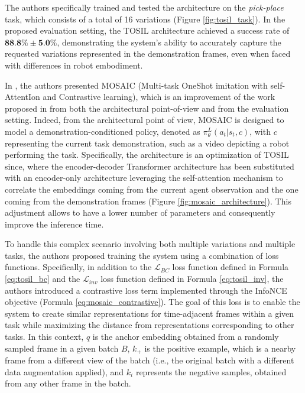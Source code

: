 The authors specifically trained and tested the architecture on the \textit{pick-place} task, which consists of a total of 16 variations (Figure \ref{fig:tosil_task}). In the proposed evaluation setting, the TOSIL architecture achieved a success rate of $\textbf{88.8}\% \pm \textbf{5.0}\%$, demonstrating the system's ability to accurately capture the requested variations represented in the demonstration frames, even when faced with differences in robot embodiment.


In \cite{mandi2022towards_more_generalizable_one_shot}, the authors presented MOSAIC (Multi-task OneShot imitation with self-AttentIon and Contrastive learning), which is an improvement of the work proposed in \cite{dasari2021transformers_one_shot} from both the architectural point-of-view and from the evaluation setting.
Indeed, from the architectural point of view, MOSAIC is designed to model a demonstration-conditioned policy, denoted as $\pi^{L}_{\theta}(a_{t}|s_{t},c)$, with $c$ representing the current task demonstration, such as a video depicting a robot performing the task. Specifically, the architecture is an optimization of TOSIL since, where the encoder-decoder Transformer architecture has been substituted with an encoder-only architecture leveraging the self-attention mechanism to correlate the embeddings coming from the current agent observation and the one coming from the demonstration frames (Figure \ref{fig:mosaic_architecture}). This adjustment allows to have a lower number of parameters and consequently improve the inference time. 


To handle this complex scenario involving both multiple variations and multiple tasks, the authors proposed training the system using a combination of loss functions. Specifically, in addition to the $\mathcal{L}_{BC}$ loss function defined in Formula \ref{eq:tosil_bc} and the $\mathcal{L}_{inv}$ loss function defined in Formula \ref{eq:tosil_inv}, the authors introduced a contrastive loss term implemented through the InfoNCE objective (Formula \ref{eq:mosaic_contrastive}). The goal of this loss is to enable the system to create similar representations for time-adjacent frames within a given task while maximizing the distance from representations corresponding to other tasks. In this context, $q$ is the anchor embedding obtained from a randomly sampled frame in a given batch $B$, $k_{+}$ is the positive example, which is a nearby frame from a different view of the batch (i.e., the original batch with a different data augmentation applied), and $k_{i}$ represents the negative samples, obtained from any other frame in the batch.

